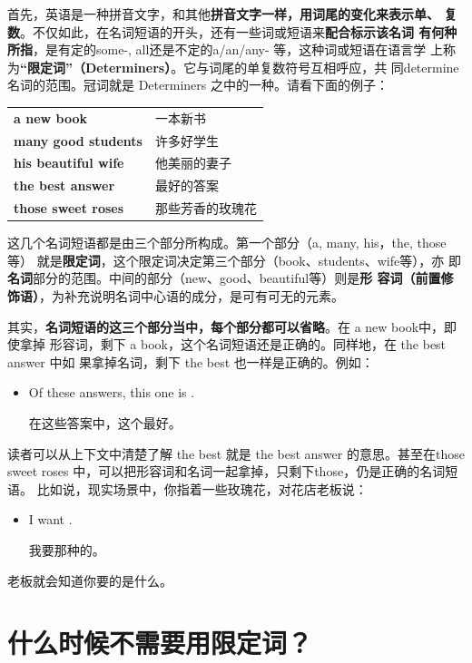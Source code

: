 首先，英语是一种拼音文字，和其他\textbf{拼音文字一样，用词尾的变化来表示单、
  复数}。不仅如此，在名词短语的开头，还有一些词或短语来\textbf{配合标示该名词
  有何种所指}，是有定的some-, all还是不定的a/an/any- 等，这种词或短语在语言学
上称为\textbf{“限定词”（Determiners）}。它与词尾的单复数符号互相呼应，共
同determine 名词的范围。冠词就是 Determiners 之中的一种。请看下面的例子：

\begin{table}[]
  \centering
  \begin{tabular}{ll}
    \textbf{a new book}         & 一本新书     \\
    \textbf{many good  students} & 许多好学生    \\
    \textbf{his beautiful wife} & 他美丽的妻子   \\
    \textbf{the best answer}    & 最好的答案    \\
    \textbf{those sweet roses}  & 那些芳香的玫瑰花
  \end{tabular}
\end{table}

这几个名词短语都是由三个部分所构成。第一个部分（a, many, his，the, those等）
就是\textbf{限定词}，这个限定词决定第三个部分（book、students、wife等），亦
即\textbf{名词}部分的范围。中间的部分（new、good、beautiful等）则是\textbf{形
  容词（前置修饰语）}，为补充说明名词中心语的成分，是可有可无的元素。

其实，\textbf{名词短语的这三个部分当中，每个部分都可以省略}。在 a new book中，即使拿掉
形容词，剩下 a book，这个名词短语还是正确的。同样地，在 the best answer 中如
果拿掉名词，剩下 the best 也一样是正确的。例如：
\begin{itemize}
\item Of these answers, this one is .

  在这些答案中，这个最好。
\end{itemize}

读者可以从上下文中清楚了解 the best 就是 the best answer 的意思。甚至在those
sweet roses 中，可以把形容词和名词一起拿掉，只剩下those，仍是正确的名词短语。
比如说，现实场景中，你指着一些玫瑰花，对花店老板说：
\begin{itemize}
\item I want .

  我要那种的。
\end{itemize}

老板就会知道你要的是什么。

\section{什么时候不需要用限定词？}

